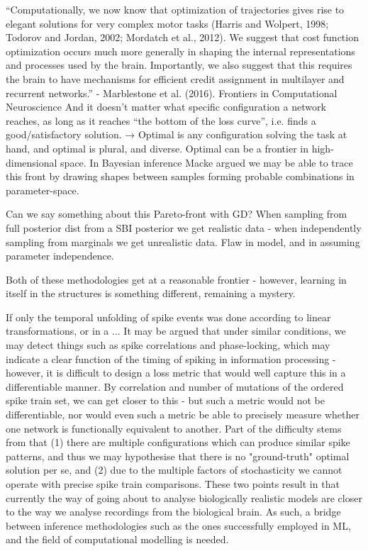 \documentclass[mphil,deptreport,ianc]{infthesis} %
\begin{document}
“Computationally, we now know that optimization of trajectories gives rise to elegant solutions for very complex motor tasks (Harris and Wolpert, 1998; Todorov and Jordan, 2002; Mordatch et al., 2012). We suggest that cost function optimization occurs much more generally in shaping the internal representations and processes used by the brain. Importantly, we also suggest that this requires the brain to have mechanisms for efficient credit assignment in multilayer and recurrent networks.” - Marblestone et al. (2016). Frontiers in Computational Neuroscience
And it doesn’t matter what specific configuration a network reaches, as long as it reaches “the bottom of the loss curve”, i.e. finds a good/satisfactory solution. → Optimal is any configuration solving the task at hand, and optimal is plural, and diverse. Optimal can be a frontier in high-dimensional space. In Bayesian inference Macke argued we may be able to trace this front by drawing shapes between samples forming probable combinations in parameter-space.

Can we say something about this Pareto-front with GD?
When sampling from full posterior dist from a SBI posterior we get realistic data - when independently sampling from marginals we get unrealistic data. Flaw in model, and in assuming parameter independence.

Both of these methodologies get at a reasonable frontier - however, learning in itself in the structures is something different, remaining a mystery.


If only the temporal unfolding of spike events was done according to linear transformations, or in a ...
It may be argued that under similar conditions, we may detect things such as spike correlations and phase-locking, which may indicate a clear function of the timing of spiking in information processing - however, it is difficult to design a loss metric that would well capture this in a differentiable manner.
By correlation and number of mutations of the ordered spike train set, we can get closer to this - but such a metric would not be differentiable, nor would even such a metric be able to precisely measure whether one network is functionally equivalent to another.
Part of the difficulty stems from that (1) there are multiple configurations which can produce similar spike patterns, and thus we may hypothesise that there is no "ground-truth" optimal solution per se, and (2) due to the multiple factors of stochasticity we cannot operate with precise spike train comparisons. These two points result in that currently the way of going about to analyse biologically realistic models are closer to the way we analyse recordings from the biological brain. As such, a bridge between inference methodologies such as the ones successfully employed in ML, and the field of computational modelling is needed.
\end{document}
